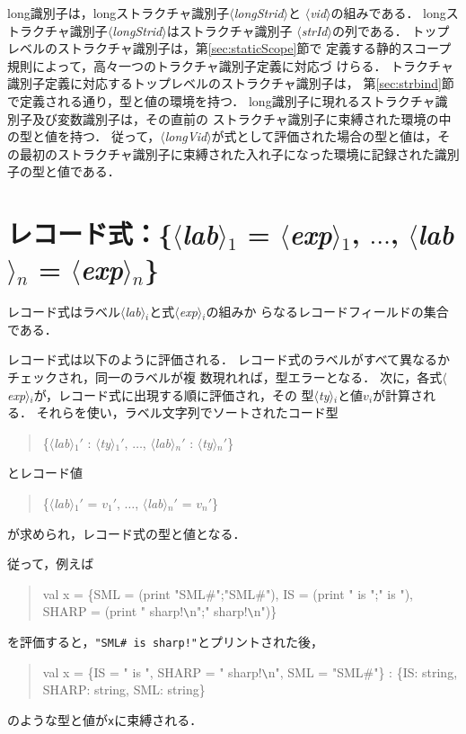 \documentclass{jbook}
\newcommand{\code}[1]{\mbox{\large\tt #1}}
\newcommand{\nonterm}[1]{\mbox{$\langle$}{\it #1}\mbox{$\rangle$}}
\newenvironment{program}{\begin{quote}\begin{tt}}%
                        {\end{tt}\end{quote}}
\begin{document}
	long識別子は，longストラクチャ識別子\nonterm{longStrid}と
\nonterm{vid}の組みである．
	longストラクチャ識別子\nonterm{longStrid}はストラクチャ識別子
\nonterm{strId}の列である．
	トップレベルのストラクチャ識別子は，第\ref{sec:staticScope}節で
定義する静的スコープ規則によって，高々一つのトラクチャ識別子定義に対応づ
けらる．
	トラクチャ識別子定義に対応するトップレベルのストラクチャ識別子は，
第\ref{sec:strbind}節で定義される通り，型と値の環境を持つ．
	long識別子に現れるストラクチャ識別子及び変数識別子は，その直前の
ストラクチャ識別子に束縛された環境の中の型と値を持つ．
	従って，\nonterm{longVid}が式として評価された場合の型と値は，そ
の最初のストラクチャ識別子に束縛された入れ子になった環境に記録された識別
子の型と値である．

\section{レコード式：\{\nonterm{lab}$_1$ = \nonterm{exp}$_1$, $\ldots$, \nonterm{lab}$_n$ = \nonterm{exp}$_n$\}}

	レコード式はラベル\nonterm{lab}$_i$と式\nonterm{exp}$_i$の組みか
らなるレコードフィールドの集合である．

	レコード式は以下のように評価される．
	レコード式のラベルがすべて異なるかチェックされ，同一のラベルが複
数現れれば，型エラーとなる．
	次に，各式\nonterm{exp}$_i$が，レコード式に出現する順に評価され，その
型\nonterm{ty}$_i$と値$v_i$が計算される．
	それらを使い，ラベル文字列でソートされたコード型
\begin{program}
\{\nonterm{lab}$_1'$ : \nonterm{ty}$_1'$, $\ldots$, \nonterm{lab}$_n'$ : \nonterm{ty}$_n'$\}
\end{program}
とレコード値
\begin{program}
\{\nonterm{lab}$_1'$ = $v_1'$, $\ldots$, \nonterm{lab}$_n'$ = $v_n'$\}
\end{program}
が求められ，レコード式の型と値となる．

	従って，例えば
\begin{program}
val x = \{SML = (print "SML\#";"SML\#"), 
          IS = (print " is ";" is "),
          SHARP = (print " sharp!\verb|\|n";" sharp!\verb|\|n")\}
\end{program}
を評価すると，\code{"SML\# is sharp!"}とプリントされた後，
\begin{program}
val x = \{IS = " is ", SHARP = " sharp!\verb|\|n", SML = "SML\#"\} : \{IS: string, SHARP: string, SML: string\}
\end{program}
のような型と値が\code{x}に束縛される．
\end{document}
